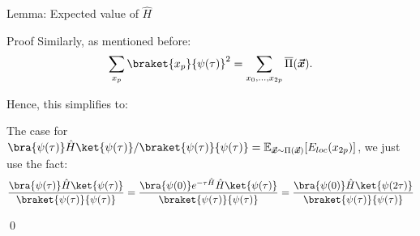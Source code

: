 \documentclass[a4paper]{article}
\begin{document}
\begin{parag}{Lemma: Expected value of $\hat{H}$}
\begin{subparag}{Proof}
        Similarly, as mentioned before: 
        \[\sum_{x_p} \braket{x_p}{\psi\left(\tau\right)}^2 = \sum_{x_0, \ldots, x_{2p}} \bar{\Pi}\left(\bvec{x}\right).\]
        
        Hence, this simplifies to: 
        
        The case for $\bra{\psi\left(\tau\right)} \hat{H} \ket{\psi\left(\tau\right)}/\braket{\psi\left(\tau\right)}{\psi\left(\tau\right)} = \exval_{\bvec{x} \followsdistr \Pi\left(\bvec{x}\right)}\left[E_{loc}\left(x_{2p}\right)\right]$, we just use the fact:
        \[\frac{\bra{\psi\left(\tau\right)} \hat{H} \ket{\psi\left(\tau\right)}}{\braket{\psi\left(\tau\right)}{\psi\left(\tau\right)}} = \frac{\bra{\psi\left(0\right)} e^{-\tau \hat{H}} \hat{H} \ket{\psi\left(\tau\right)}}{\braket{\psi\left(\tau\right)}{\psi\left(\tau\right)}} = \frac{\bra{\psi\left(0\right)} \hat{H} \ket{\psi\left(2\tau\right)}}{\braket{\psi\left(\tau\right)}{\psi\left(\tau\right)}}\]

        \qed
    \end{subparag}
\end{parag}
\end{document}
